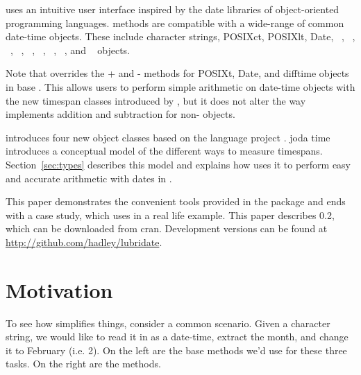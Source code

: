 \documentclass[article]{jss}
\begin{document}
 uses an intuitive user interface inspired by the date libraries of object-oriented programming languages.   methods are compatible with a wide-range of common date-time objects. These include character strings, POSIXct, POSIXlt, Date,  ~\citep{chron},  ~\citep{fCalendar},  ~\citep{zoo},  ~\citep{xts},  ~\citep{its},  ~\citep{tis},  ~\citep{timeSeries},  ~\citep{fts}, and  ~\citep{tseries} objects. 

Note that  overrides the + and - methods for POSIXt, Date, and difftime objects in base . This allows users to perform simple arithmetic on date-time objects with the new timespan classes introduced by , but it does not alter the way  implements addition and subtraction for non- objects.

 introduces four new object classes based on the  language  project \citep{jodatime}. joda time introduces a conceptual model of the different ways to measure timespans. Section~\ref{sec:types} describes this model and explains how  uses it to perform easy and accurate arithmetic with dates in . 



This paper demonstrates the convenient tools provided in the  package and ends with a case study, which uses  in a real life example. This paper describes  0.2, which can be downloaded from {\sc cran}. Development versions can be found at \url{http://github.com/hadley/lubridate}.

\section{Motivation}

To see how  simplifies things, consider a common scenario. Given a character string, we would like to read it in as a date-time, extract the month, and change it to February (i.e. 2). On the left are the base  methods we'd use for these three tasks.  On the right are the  methods.
\end{document}
